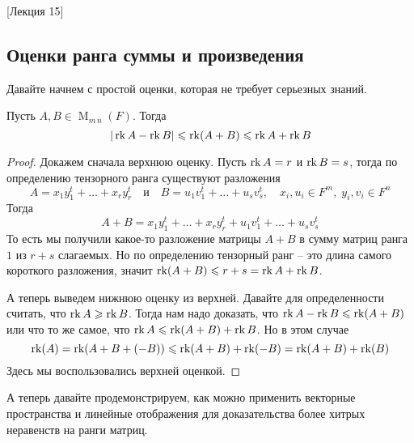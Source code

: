 [Лекция 15]


\subsection{Оценки ранга суммы и произведения}

Давайте начнем с простой оценки, которая не требует серьезных знаний.

\begin{claim}
Пусть $A,B\in \operatorname{M}_{m\, n}(F)$.
Тогда
\[
|\operatorname{rk} A - \operatorname{rk} B| \leqslant \operatorname{rk}(A + B) \leqslant \operatorname{rk} A + \operatorname{rk} B
\]
\end{claim}
\begin{proof}
Докажем сначала верхнюю оценку.
Пусть $\operatorname{rk} A = r$ и $\operatorname{rk} B = s$, тогда по определению тензорного ранга существуют разложения
\[
A = x_1 y_1^t + \ldots + x_r y_r^t\quad \text{и}\quad
B = u_1 v_1^t + \ldots + u_s v_s^t,\quad x_i, u_i\in F^m,\;y_i,v_i\in F^n
\]
Тогда
\[
A + B = x_1 y_1^t + \ldots + x_r y_r^t + u_1 v_1^t + \ldots + u_s v_s^t
\]
То есть мы получили какое-то разложение матрицы $A+ B$ в сумму матриц ранга $1$ из $r+s$ слагаемых.
Но по определению тензорный ранг -- это длина самого короткого разложения, значит $\operatorname{rk}(A+B) \leqslant r + s = \operatorname{rk} A + \operatorname{rk} B$.

А теперь выведем нижнюю оценку из верхней.
Давайте для определенности считать, что  $\operatorname{rk} A \geqslant \operatorname{rk} B$.
Тогда нам надо доказать, что $\operatorname{rk} A - \operatorname{rk} B \leqslant \operatorname{rk}(A + B)$ или что то же самое, что $\operatorname{rk} A \leqslant \operatorname{rk} (A+B) + \operatorname{rk} B$.
Но в этом случае
\[
\operatorname{rk} (A) = \operatorname{rk}(A + B + (-B)) \leqslant \operatorname{rk}(A+B) +\operatorname{rk}(-B) = \operatorname{rk} (A+B) + \operatorname{rk}(B)
\]
Здесь мы воспользовались верхней оценкой.
\end{proof}


А теперь давайте продемонстрируем, как можно применить векторные пространства и линейные отображения для доказательства более хитрых неравенств на ранги матриц.

